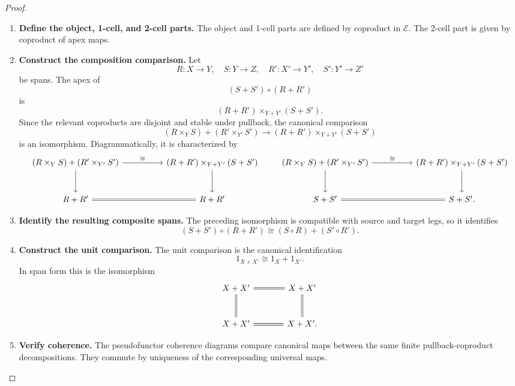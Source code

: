 \begin{proof}
\begin{enumerate}
  \item \textbf{Define the object, 1-cell, and 2-cell parts.}
  The object and 1-cell parts are defined by coproduct in \(\mathcal E\). The
  2-cell part is given by coproduct of apex maps.

  \item \textbf{Construct the composition comparison.}
  Let
  \[
    R:X\to Y,\quad S:Y\to Z,\quad
    R':X'\to Y',\quad S':Y'\to Z'
  \]
  be spans. The apex of
  \[
    (S+S')\circ(R+R')
  \]
  is
  \[
    (R+R')\times_{Y+Y'}(S+S').
  \]
  Since the relevant coproducts are disjoint and stable under pullback, the
  canonical comparison
  \[
    (R\times_Y S)+(R'\times_{Y'}S')
    \longrightarrow
    (R+R')\times_{Y+Y'}(S+S')
  \]
  is an isomorphism. Diagrammatically, it is characterized by
  \[
  \begin{tikzcd}[column sep=huge,row sep=large]
    (R\times_Y S)+(R'\times_{Y'}S')
      \ar[r,"\cong"]
      \ar[d]
    &
    (R+R')\times_{Y+Y'}(S+S')
      \ar[d]
    \\
    R+R'
      \ar[r,equal]
    &
    R+R'
  \end{tikzcd}
  \qquad
  \begin{tikzcd}[column sep=huge,row sep=large]
    (R\times_Y S)+(R'\times_{Y'}S')
      \ar[r,"\cong"]
      \ar[d]
    &
    (R+R')\times_{Y+Y'}(S+S')
      \ar[d]
    \\
    S+S'
      \ar[r,equal]
    &
    S+S' .
  \end{tikzcd}
  \]

  \item \textbf{Identify the resulting composite spans.}
  The preceding isomorphism is compatible with source and target legs, so it
  identifies
  \[
    (S+S')\circ(R+R')
    \cong
    (S\circ R)+(S'\circ R').
  \]

  \item \textbf{Construct the unit comparison.}
  The unit comparison is the canonical identification
  \[
    1_{X+X'}\cong 1_X+1_{X'}.
  \]
  In span form this is the isomorphism
  \[
  \begin{tikzcd}[column sep=large,row sep=large]
    X+X'
      \ar[d,equal]
      \ar[r,equal]
    &
    X+X'
      \ar[d,equal]
  \\
    X+X'
      \ar[r,equal]
    &
    X+X' .
  \end{tikzcd}
  \]

  \item \textbf{Verify coherence.}
  The pseudofunctor coherence diagrams compare canonical maps between the same
  finite pullback-coproduct decompositions. They commute by uniqueness of the
  corresponding universal maps.
\end{enumerate}
\end{proof}

